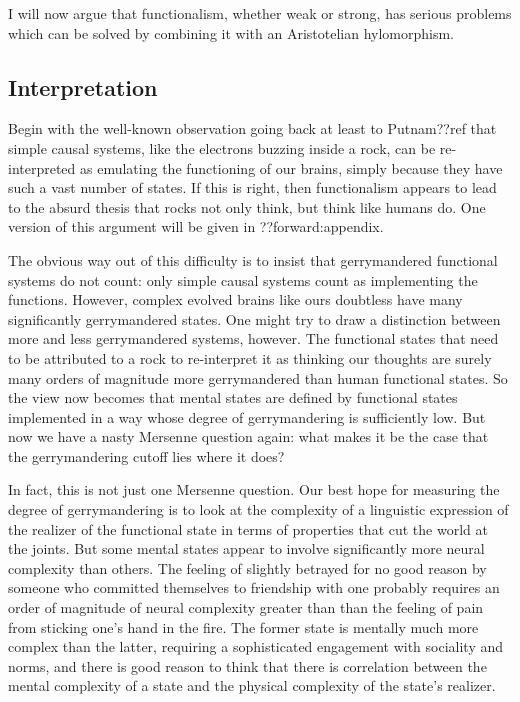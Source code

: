 I will now argue that functionalism, whether weak or strong, has serious problems which can be solved by combining it with an Aristotelian hylomorphism.

\subsection{Interpretation}
Begin with the well-known observation going back at least to Putnam??ref that simple causal systems, like the electrons buzzing inside a rock, can be re-interpreted as 
emulating the functioning of our brains, simply because they have such a vast number of states. If this is right, then functionalism 
appears to lead to the absurd thesis that rocks not only think, but think like humans do. One version of this argument will be given in ??forward:appendix. 

The obvious way out of this difficulty is to insist that gerrymandered functional systems do not count: only simple causal
systems count as implementing the functions. However, complex evolved brains like ours doubtless have many  significantly
gerrymandered states. One might try to draw a distinction between more and less gerrymandered systems, however. The functional states 
that need to be attributed to a rock to re-interpret it as thinking our thoughts are surely many orders of magnitude more gerrymandered
than human functional states. So the view now becomes that mental states are defined by functional states implemented
in a way whose degree of gerrymandering is sufficiently low.  But now we have a nasty Mersenne question again: 
what makes it be the case that the gerrymandering cutoff lies where it does?

In fact, this is not just one Mersenne question. Our best hope for measuring the degree of gerrymandering is to
look at the complexity of a linguistic expression of the realizer of the functional state in terms of properties that cut
the world at the joints. But some mental states appear to involve significantly more neural complexity than others.
The feeling of slightly betrayed for no good reason by someone who committed themselves to friendship with one 
probably requires an order of magnitude of neural complexity greater than than the feeling of pain from sticking
one's hand in the fire. The former state is mentally much more complex than the latter, requiring a sophisticated
engagement with sociality and norms, and there is good reason to think that there is correlation between the mental
complexity of a state and the physical complexity of the state's realizer. 


